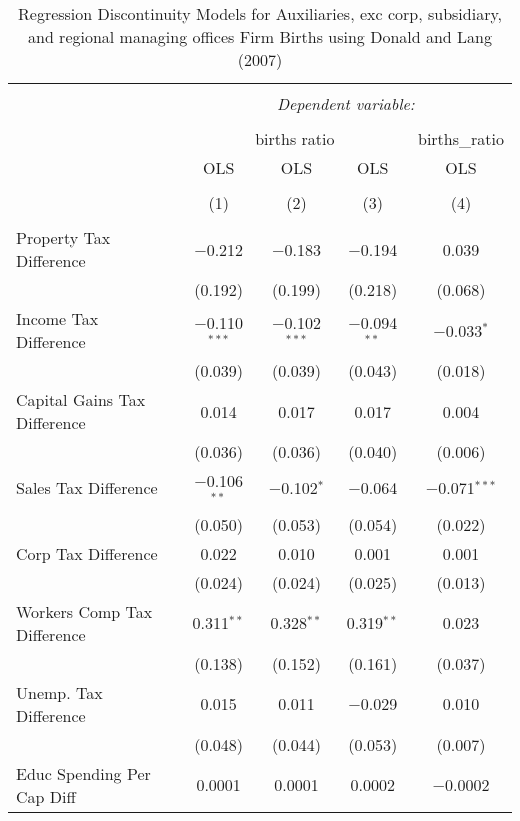 
\begin{table}[!htbp] \centering 
  \caption{Regression Discontinuity Models for  Auxiliaries, exc corp, subsidiary, and regional managing offices Firm Births using Donald and Lang (2007)} 
  \label{} 
\begin{tabular}{@{\extracolsep{5pt}}lcccc} 
\\[-1.8ex]\hline 
\hline \\[-1.8ex] 
 & \multicolumn{4}{c}{\textit{Dependent variable:}} \\ 
\cline{2-5} 
\\[-1.8ex] & \multicolumn{3}{c}{births ratio} & births\_ratio \\ 
 & OLS & OLS & OLS & OLS \\ 
\\[-1.8ex] & (1) & (2) & (3) & (4)\\ 
\hline \\[-1.8ex] 
 Property Tax Difference & $-$0.212 & $-$0.183 & $-$0.194 & 0.039 \\ 
  & (0.192) & (0.199) & (0.218) & (0.068) \\ 
  Income Tax Difference & $-$0.110$^{***}$ & $-$0.102$^{***}$ & $-$0.094$^{**}$ & $-$0.033$^{*}$ \\ 
  & (0.039) & (0.039) & (0.043) & (0.018) \\ 
  Capital Gains Tax Difference & 0.014 & 0.017 & 0.017 & 0.004 \\ 
  & (0.036) & (0.036) & (0.040) & (0.006) \\ 
  Sales Tax Difference & $-$0.106$^{**}$ & $-$0.102$^{*}$ & $-$0.064 & $-$0.071$^{***}$ \\ 
  & (0.050) & (0.053) & (0.054) & (0.022) \\ 
  Corp Tax Difference & 0.022 & 0.010 & 0.001 & 0.001 \\ 
  & (0.024) & (0.024) & (0.025) & (0.013) \\ 
  Workers Comp Tax Difference & 0.311$^{**}$ & 0.328$^{**}$ & 0.319$^{**}$ & 0.023 \\ 
  & (0.138) & (0.152) & (0.161) & (0.037) \\ 
  Unemp. Tax Difference & 0.015 & 0.011 & $-$0.029 & 0.010 \\ 
  & (0.048) & (0.044) & (0.053) & (0.007) \\ 
  Educ Spending Per Cap Diff & 0.0001 & 0.0001 & 0.0002 & $-$0.0002 \\ 

\end{tabular}
\end{table}
